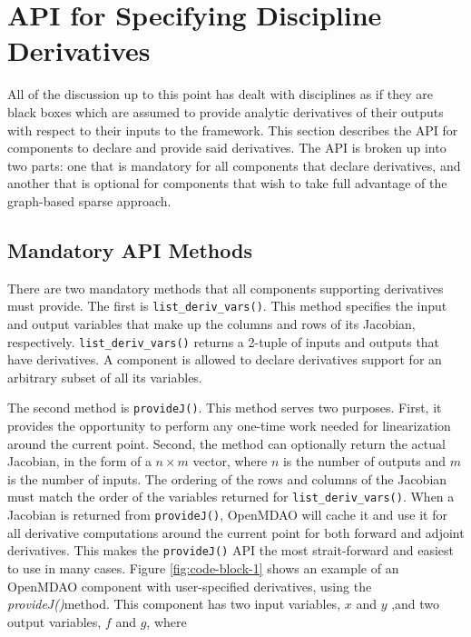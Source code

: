 \documentclass[]{aiaa-tc} %
\begin{document}
    \section{API for Specifying Discipline Derivatives}

        All of the discussion up to this point has dealt with disciplines as if they are black boxes
        which are assumed to provide analytic derivatives of their outputs with respect to their inputs
        to the framework. This section describes the API for components to declare and provide
        said derivatives. The API is broken up into two parts: one that is mandatory for all components
        that declare derivatives, and another that is optional for components that wish to take full
        advantage of the graph-based sparse approach.

        \subsection{Mandatory API Methods}

        There are two mandatory methods that all components supporting derivatives must provide.
        The first is \texttt{list\_deriv\_vars()}. This method specifies the
        input and output variables that make up the columns and rows of its Jacobian, respectively.
        \texttt{list\_deriv\_vars()} returns a 2-tuple of inputs and outputs that have derivatives.
        A component is allowed to declare derivatives support for an arbitrary subset of all its variables.

        The second method is \texttt{provideJ()}. This method serves two purposes. First, it provides the
        opportunity to perform any one-time work needed for linearization around the current point. Second,
        the method can optionally return the actual Jacobian, in the form of a $n \times m$ vector, where $n$ is the
        number of outputs and $m$ is the number of inputs. The ordering of the rows and columns of the Jacobian
        must match the order of the variables returned for \texttt{list\_deriv\_vars()}. When a Jacobian is
        returned from \texttt{provideJ()}, OpenMDAO will cache it and use it for all derivative computations
        around the current point for both forward and adjoint derivatives. This makes the \texttt{provideJ()}
        API the most strait-forward and easiest to use in many cases. Figure \ref{fig:code-block-1} shows
        an example of an OpenMDAO component with user-specified derivatives, using the \textit{provideJ()}method.
        This component has two input variables, $x$ and $y$ ,and two output variables, $f$ and $g$, where
\end{document}
